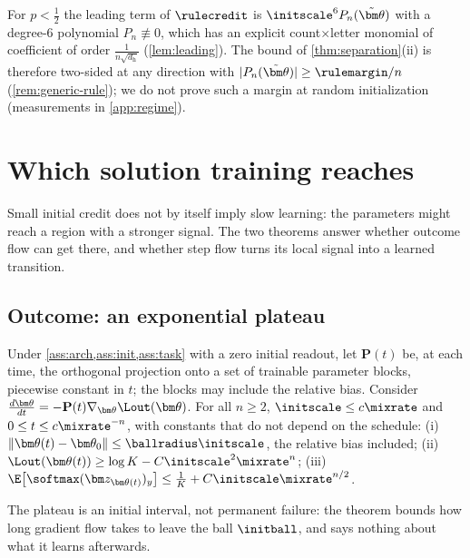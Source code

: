 \begin{remark}
\label{rem:leading-main}
For $p<\frac12$ the leading term of $\rulecredit$ is $\initscale^6P_n(\tilde{\bm\theta})$ with a degree-$6$ polynomial $P_n\not\equiv0$, which
has an explicit count$\times$letter monomial of coefficient of order $\frac{1}{n\sqrt{d_{\mathrm h}}}$ (\cref{lem:leading}). The bound of
\cref{thm:separation}(ii) is therefore two-sided at any direction with $|P_n(\tilde{\bm\theta})|\ge\rulemargin/n$ (\cref{rem:generic-rule}); we do not
prove such a margin at random initialization (measurements in \cref{app:regime}).
\end{remark}

\section{Which solution training reaches}
\label{sec:reach}

Small initial credit does not by itself imply slow learning: the parameters might reach a region with a stronger signal. The two
theorems answer whether outcome flow can get there, and whether step flow turns its local signal into a learned transition.

\subsection{Outcome: an exponential plateau}

\begin{theorem}
\label{thm:outcome-end}
Under \cref{ass:arch,ass:init,ass:task} with a zero initial readout, let $\mathbf P(t)$ be, at each time, the orthogonal projection onto a set
of trainable parameter blocks, piecewise constant in $t$; the blocks may include the relative bias. Consider
$\tfrac{d\bm\theta}{dt}=-\mathbf P(t)\nabla_{\bm\theta}\Lout(\bm\theta)$. For all $n\ge2$, $\initscale\le c\mixrate$ and $0\le t\le c\mixrate^{-n}$, with
constants that do not depend on the schedule:
(i)~$\|\bm\theta(t)-\bm\theta_0\|\le\ballradius\initscale$, the relative bias included;
(ii)~$\Lout(\bm\theta(t))\ge\log K-C\initscale^2\mixrate^n$;
(iii)~$\E\bigl[\softmax(\bm z_{\bm\theta(t)})_y\bigr]\le\frac{1}{K}+C\initscale\mixrate^{n/2}$.
\end{theorem}

The plateau is an initial interval, not permanent failure: the theorem bounds how long gradient flow takes to leave the ball
$\initball$, and says nothing about what it learns afterwards.

